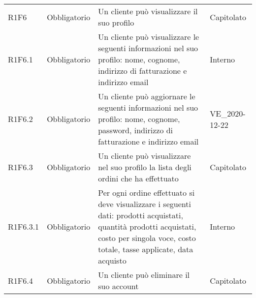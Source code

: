 {\begin{longtable}{C{2.5cm} C{2.8cm} C{6.7cm} C{2.5cm}}

R1F6 & Obbligatorio & Un cliente può visualizzare il suo profilo & Capitolato \\
R1F6.1 & Obbligatorio & Un cliente può visualizzare le seguenti informazioni nel suo profilo: nome, cognome, indirizzo di fatturazione e indirizzo email & Interno \\
R1F6.2 & Obbligatorio & Un cliente può aggiornare le seguenti informazioni nel suo profilo: nome, cognome, password, indirizzo di fatturazione e indirizzo email & VE\_2020-12-22 \\
R1F6.3 & Obbligatorio & Un cliente può visualizzare nel suo profilo la lista degli ordini che ha effettuato & Capitolato \\
R1F6.3.1 & Obbligatorio & Per ogni ordine effettuato si deve visualizzare i seguenti dati: prodotti acquistati, quantità prodotti acquistati, costo per singola voce, costo totale, tasse applicate, data acquisto & Interno \\
R1F6.4 & Obbligatorio & Un cliente può eliminare il suo account & Capitolato \\



\end{longtable}}
